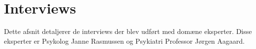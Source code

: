 \section{Interviews}
Dette afsnit detaljerer de interviews der blev udført med domæne eksperter. Disse eksperter er Psykolog Janne Rasmussen og Psykiatri Professor Jørgen Aagaard.